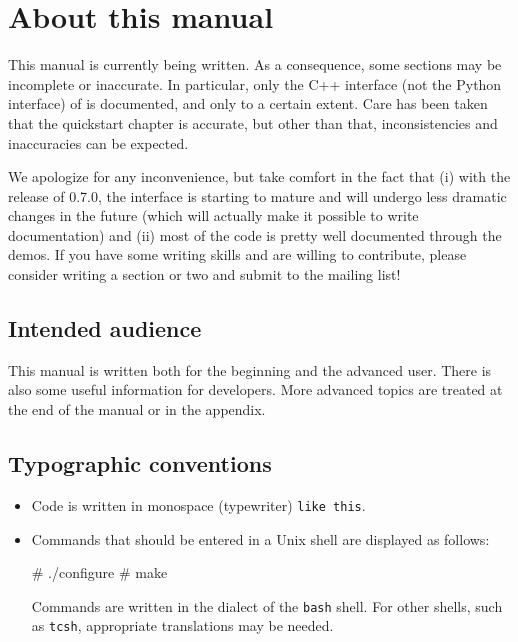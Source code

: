 \chapter*{About this manual}

This manual is currently being written. As a consequence, some
sections may be incomplete or inaccurate. In particular, only the C++
interface (not the Python interface) of \dolfin{} is documented, and
only to a certain extent. Care has been taken that the quickstart
chapter is accurate, but other than that, inconsistencies and
inaccuracies can be expected.

We apologize for any inconvenience, but take comfort in the fact that
(i) with the release of \dolfin{} 0.7.0, the interface is starting to
mature and will undergo less dramatic changes in the future (which
will actually make it possible to write documentation) and (ii) most
of the code is pretty well documented through the demos. If you have
some writing skills and are willing to contribute, please consider
writing a section or two and submit to the mailing list!

\section*{Intended audience}

This manual is written both for the beginning and the advanced user.
There is also some useful information for developers. More advanced topics
are treated at the end of the manual or in the appendix.

\section*{Typographic conventions}

\begin{itemize}
\item
  Code is written in monospace (typewriter) \texttt{like this}.
\item
  Commands that should be entered in a Unix shell
  are displayed as follows:
  \begin{code}
# ./configure
# make
  \end{code}
  Commands are written in the dialect of the \texttt{bash} shell. For
  other shells, such as \texttt{tcsh}, appropriate translations may be
  needed.
\end{itemize}


